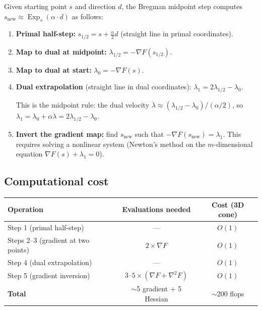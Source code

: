 \documentclass[11pt]{article}
\DeclareMathOperator{\Exp}{Exp}
\begin{document}
Given starting point $s$ and direction $d$, the Bregman midpoint step computes
$s_{\text{new}} \approx \Exp_s(\alpha \cdot d)$ as follows:
\begin{enumerate}
  \item \textbf{Primal half-step:}
    $s_{1/2} = s + \frac{\alpha}{2} d$ \quad (straight line in primal coordinates).

  \item \textbf{Map to dual at midpoint:}
    $\lambda_{1/2} = -\nabla F(s_{1/2})$.

  \item \textbf{Map to dual at start:}
    $\lambda_0 = -\nabla F(s)$.

  \item \textbf{Dual extrapolation} (straight line in dual coordinates):
    $\lambda_1 = 2\lambda_{1/2} - \lambda_0$.

    This is the midpoint rule: the dual velocity
    $\dot\lambda \approx (\lambda_{1/2} - \lambda_0) / (\alpha/2)$, so
    $\lambda_1 = \lambda_0 + \alpha \dot\lambda = 2\lambda_{1/2} - \lambda_0$.

  \item \textbf{Invert the gradient map:} find $s_{\text{new}}$ such that
    $-\nabla F(s_{\text{new}}) = \lambda_1$.  This requires solving a
    nonlinear system (Newton's method on the $m$-dimensional equation
    $\nabla F(s) + \lambda_1 = 0$).
\end{enumerate}

\subsection{Computational cost}

\begin{center}
\begin{tabular}{@{}lcc@{}}
\toprule
\textbf{Operation} & \textbf{Evaluations needed} & \textbf{Cost (3D cone)} \\
\midrule
Step 1 (primal half-step) & --- & $O(1)$ \\
Steps 2--3 (gradient at two points) & $2 \times \nabla F$ & $O(1)$ \\
Step 4 (dual extrapolation) & --- & $O(1)$ \\
Step 5 (gradient inversion) & $3$--$5 \times (\nabla F + \nabla^2 F)$ & $O(1)$ \\
\midrule
\textbf{Total} & $\sim$5 gradient + 5 Hessian & $\sim$200 flops \\
\bottomrule
\end{tabular}
\end{center}
\end{document}
